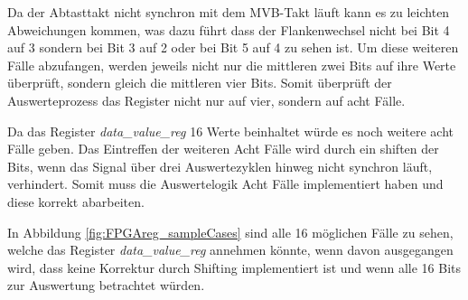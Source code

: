 




Da der Abtasttakt nicht synchron mit dem MVB-Takt läuft kann es zu leichten Abweichungen kommen, was dazu führt dass der Flankenwechsel nicht bei Bit 4 auf
3 sondern bei Bit 3 auf 2 oder bei Bit 5 auf 4 zu sehen ist. Um diese weiteren Fälle abzufangen, werden jeweils nicht nur die 
mittleren zwei Bits auf ihre Werte überprüft, sondern gleich die mittleren vier Bits. Somit überprüft der Auswerteprozess das Register nicht nur auf vier, sondern auf acht Fälle.

Da das Register \textit{data\_value\_reg} 16 Werte beinhaltet würde es noch weitere acht Fälle
geben. Das Eintreffen der weiteren Acht Fälle wird durch ein shiften der Bits, wenn das Signal über
drei Auswertezyklen hinweg nicht synchron läuft, verhindert. Somit muss die Auswertelogik Acht
Fälle implementiert haben und diese korrekt abarbeiten.

In Abbildung \ref{fig:FPGAreg_sampleCases} sind alle 16 möglichen Fälle zu 
sehen, welche das Register \textit{data\_value\_reg} annehmen könnte, wenn davon 
ausgegangen wird, dass keine Korrektur durch Shifting implementiert ist und wenn
alle 16 Bits zur Auswertung betrachtet würden.

